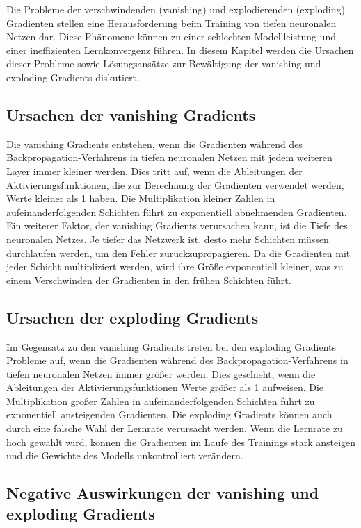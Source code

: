     Die Probleme der verschwindenden (vanishing) und explodierenden (exploding) Gradienten stellen eine Herausforderung beim Training von tiefen neuronalen Netzen dar. 
    Diese Phänomene können zu einer schlechten Modellleistung und einer ineffizienten Lernkonvergenz führen. 
    In diesem Kapitel werden die Ursachen dieser Probleme sowie Lösungsansätze zur Bewältigung der vanishing und exploding Gradients diskutiert.

\subsection{Ursachen der vanishing Gradients}

    Die vanishing Gradients entstehen, wenn die Gradienten während des Backpropagation-Verfahrens in tiefen neuronalen Netzen mit jedem weiteren Layer immer kleiner werden. 
    Dies tritt auf, wenn die Ableitungen der Aktivierungsfunktionen, die zur Berechnung der Gradienten verwendet werden, Werte kleiner als 1 haben.
    Die Multiplikation kleiner Zahlen in aufeinanderfolgenden Schichten führt zu exponentiell abnehmenden Gradienten.
    Ein weiterer Faktor, der vanishing Gradients verursachen kann, ist die Tiefe des neuronalen Netzes. 
    Je tiefer das Netzwerk ist, desto mehr Schichten müssen durchlaufen werden, um den Fehler zurückzupropagieren. 
    Da die Gradienten mit jeder Schicht multipliziert werden, wird ihre Größe exponentiell kleiner, was zu einem Verschwinden der Gradienten in den frühen Schichten führt.

\subsection{Ursachen der exploding Gradients}

    Im Gegensatz zu den vanishing Gradients treten bei den exploding Gradients Probleme auf, wenn die Gradienten während des Backpropagation-Verfahrens in tiefen neuronalen Netzen immer größer werden. 
    Dies geschieht, wenn die Ableitungen der Aktivierungsfunktionen Werte größer als 1 aufweisen. Die Multiplikation großer Zahlen in aufeinanderfolgenden Schichten führt zu exponentiell ansteigenden Gradienten.
    Die exploding Gradients können auch durch eine falsche Wahl der Lernrate verursacht werden. 
    Wenn die Lernrate zu hoch gewählt wird, können die Gradienten im Laufe des Trainings stark ansteigen und die Gewichte des Modells unkontrolliert verändern.

\subsection{Negative Auswirkungen der vanishing und exploding Gradients}

